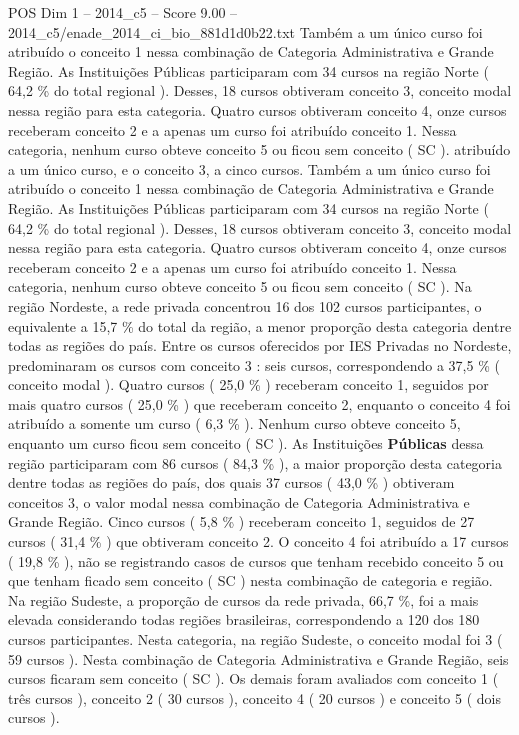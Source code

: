 \begin{textsample}{POS Dim 1 – 2014\_c5 – Score 9.00 – 2014\_c5/enade\_2014\_ci\_bio\_881d1d0b22.txt}
Também a um único curso foi atribuído o conceito 1 nessa combinação de Categoria Administrativa e Grande Região.
As Instituições Públicas participaram com 34 cursos na região Norte ( 64,2 \% do total regional ).
Desses, 18 cursos obtiveram conceito 3, conceito modal nessa região para esta categoria.
Quatro cursos obtiveram conceito 4, onze cursos receberam conceito 2 e a apenas um curso foi atribuído conceito 1.
Nessa categoria, nenhum curso obteve conceito 5 ou ficou sem conceito ( SC ). atribuído a um único curso, e o conceito 3, a cinco cursos.
Também a um único curso foi atribuído o conceito 1 nessa combinação de Categoria Administrativa e Grande Região.
As Instituições Públicas participaram com 34 cursos na região Norte ( 64,2 \% do total regional ).
Desses, 18 cursos obtiveram conceito 3, conceito modal nessa região para esta categoria.
Quatro cursos obtiveram conceito 4, onze cursos receberam conceito 2 e a apenas um curso foi atribuído conceito 1.
Nessa categoria, nenhum curso obteve conceito 5 ou ficou sem conceito ( SC ).
Na região Nordeste, a rede privada concentrou 16 dos 102 cursos participantes, o equivalente a 15,7 \% do total da região, a menor proporção desta categoria dentre todas as regiões do país.
Entre os cursos oferecidos por IES Privadas no Nordeste, predominaram os cursos com conceito 3 : seis cursos, correspondendo a 37,5 \% ( conceito modal ).
Quatro cursos ( 25,0 \% ) receberam conceito 1, seguidos por mais quatro cursos ( 25,0 \% ) que receberam conceito 2, enquanto o conceito 4 foi atribuído a somente um curso ( 6,3 \% ).
Nenhum curso obteve conceito 5, enquanto um curso ficou sem conceito ( SC ).
As Instituições \textbf{Públicas} dessa região participaram com 86 cursos ( 84,3 \% ), a maior proporção desta categoria dentre todas as regiões do país, dos quais 37 cursos ( 43,0 \% ) obtiveram conceitos 3, o valor modal nessa combinação de Categoria Administrativa e Grande Região.
Cinco cursos ( 5,8 \% ) receberam conceito 1, seguidos de 27 cursos ( 31,4 \% ) que obtiveram conceito 2.
O conceito 4 foi atribuído a 17 cursos ( 19,8 \% ), não se registrando casos de cursos que tenham recebido conceito 5 ou que tenham ficado sem conceito ( SC ) nesta combinação de categoria e região.
Na região Sudeste, a proporção de cursos da rede privada, 66,7 \%, foi a mais elevada considerando todas regiões brasileiras, correspondendo a 120 dos 180 cursos participantes.
Nesta categoria, na região Sudeste, o conceito modal foi 3 ( 59 cursos ).
Nesta combinação de Categoria Administrativa e Grande Região, seis cursos ficaram sem conceito ( SC ).
Os demais foram avaliados com conceito 1 ( três cursos ), conceito 2 ( 30 cursos ), conceito 4 ( 20 cursos ) e conceito 5 ( dois cursos ).

\end{textsample}
